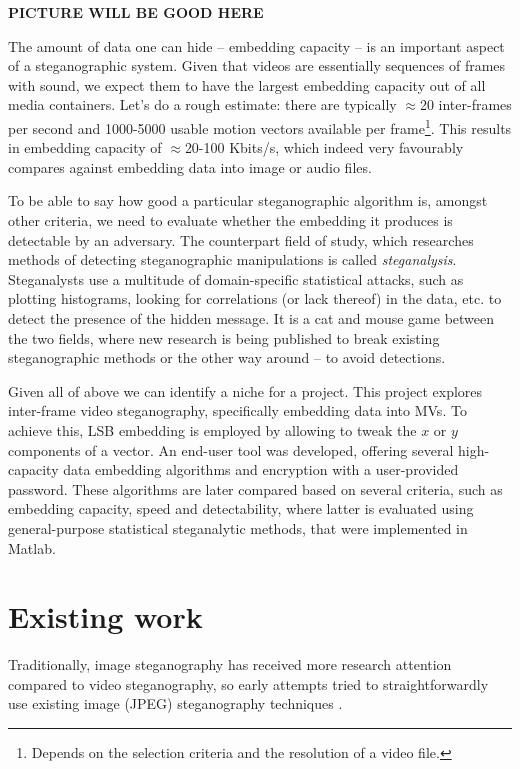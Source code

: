 \documentclass[12pt,british,twoside,notitlepage,usenames,dvipsnames,hypens,final]{report}
\numberwithin{equation}{section}
\numberwithin{figure}{section}
\begin{document}
\textbf{PICTURE WILL BE GOOD HERE}

The amount of data one can hide -- embedding capacity -- is an important aspect of a steganographic system. Given that videos are essentially sequences of frames with sound, we expect them to have the largest embedding capacity out of all media containers. Let's do a rough estimate: there are typically $\approx$20 inter-frames per second and 1000-5000 usable motion vectors available per frame\footnote{Depends on the selection criteria and the resolution of a video file.}. This results in embedding capacity of $\approx$20-100 Kbits/s, which indeed very favourably compares against embedding data into image or audio files.

To be able to say how good a particular steganographic algorithm is, amongst other criteria, we need to evaluate whether the embedding it produces is detectable by an adversary. The counterpart field of study, which researches methods of detecting steganographic manipulations is called \emph{steganalysis}. Steganalysts use a multitude of domain-specific statistical attacks, such as plotting histograms, looking for correlations (or lack thereof) in the data, etc. to detect the presence of the hidden message. It is a cat and mouse game between the two fields, where new research is being published to break existing steganographic methods or the other way around -- to avoid detections.

Given all of above we can identify a niche for a project. This project explores inter-frame video steganography, specifically embedding data into MVs. To achieve this, LSB embedding is employed by allowing to tweak the $x$ or $y$ components of a vector. An end-user tool was developed, offering several high-capacity data embedding algorithms and encryption with a user-provided password. These algorithms are later compared based on several criteria, such as embedding capacity, speed and detectability, where latter is evaluated using general-purpose statistical steganalytic methods, that were implemented in Matlab. 

\section{Existing work}

Traditionally, image steganography has received more research attention compared to video steganography, so early attempts tried to straightforwardly use existing image (JPEG) steganography techniques \cite{bateman, jpegdctcoding}.
\end{document}
